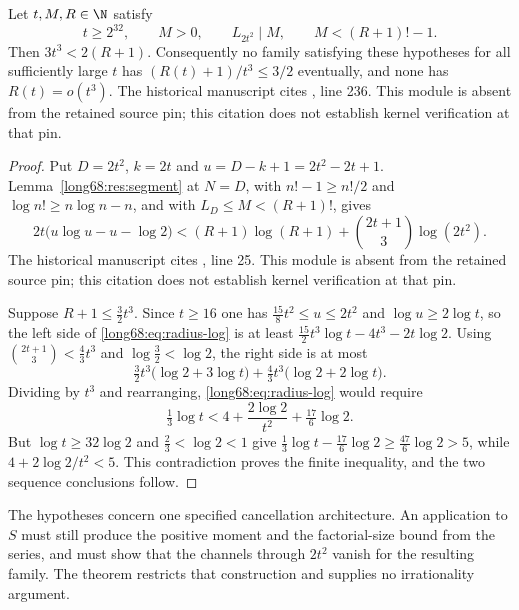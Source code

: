 \documentclass[11pt]{article}
\newcommand{\Ser}{S}
\newcommand{\Lc}{L}
\begin{document}
\label{long68:res:lead-channel-radius}
\begin{theorem}\label{long68:res:channel-radius}
Let $t,M,R\in\N$ satisfy
\[
 t\ge2^{32},\qquad M>0,\qquad \Lc_{2t^2}\mid M,\qquad M<(R+1)!-1 .
\]
Then $3t^3<2(R+1)$.  Consequently no family satisfying these hypotheses for
all sufficiently large $t$ has $(R(t)+1)/t^3\le3/2$ eventually, and none has
$R(t)=o(t^3)$.
  The historical manuscript cites , line 236. This module is absent from the retained source pin; this citation does not establish kernel verification at that pin.
\end{theorem}

\begin{proof}
Put $D=2t^2$, $k=2t$ and $u=D-k+1=2t^2-2t+1$.  Lemma~\ref{long68:res:segment} at
$N=D$, with $n!-1\ge n!/2$ and $\log n!\ge n\log n-n$, and with
$\Lc_D\le M<(R+1)!$, gives
\begin{equation}\label{long68:eq:radius-log}
 2t\bigl(u\log u-u-\log2\bigr)
 <(R+1)\log(R+1)+\binom{2t+1}{3}\log(2t^2).
\end{equation}
  The historical manuscript cites , line 25. This module is absent from the retained source pin; this citation does not establish kernel verification at that pin.

Suppose $R+1\le\tfrac32t^3$.  Since $t\ge16$ one has
$\tfrac{15}{8}t^2\le u\le2t^2$ and $\log u\ge2\log t$, so the left side of
\eqref{long68:eq:radius-log} is at least
$\tfrac{15}{2}t^3\log t-4t^3-2t\log2$.  Using
$\binom{2t+1}{3}<\tfrac43t^3$ and $\log\tfrac32<\log2$, the right side is at
most
\[
 \tfrac32t^3\bigl(\log2+3\log t\bigr)+\tfrac43t^3\bigl(\log2+2\log t\bigr).
\]
Dividing by $t^3$ and rearranging, \eqref{long68:eq:radius-log} would require
\[
 \tfrac13\log t<4+\frac{2\log2}{t^2}+\tfrac{17}6\log2 .
\]
But $\log t\ge32\log2$ and $\tfrac23<\log2<1$ give
$\tfrac13\log t-\tfrac{17}6\log2\ge\tfrac{47}6\log2>5$, while
$4+2\log2/t^2<5$.  This contradiction proves the finite inequality, and the
two sequence conclusions follow.
\end{proof}

The hypotheses concern one specified cancellation architecture.  An
application to $\Ser$ must still produce the positive moment and the
factorial-size bound from the series, and must show that the channels through
$2t^2$ vanish for the resulting family.  The theorem restricts that
construction and supplies no irrationality argument.
\end{document}
